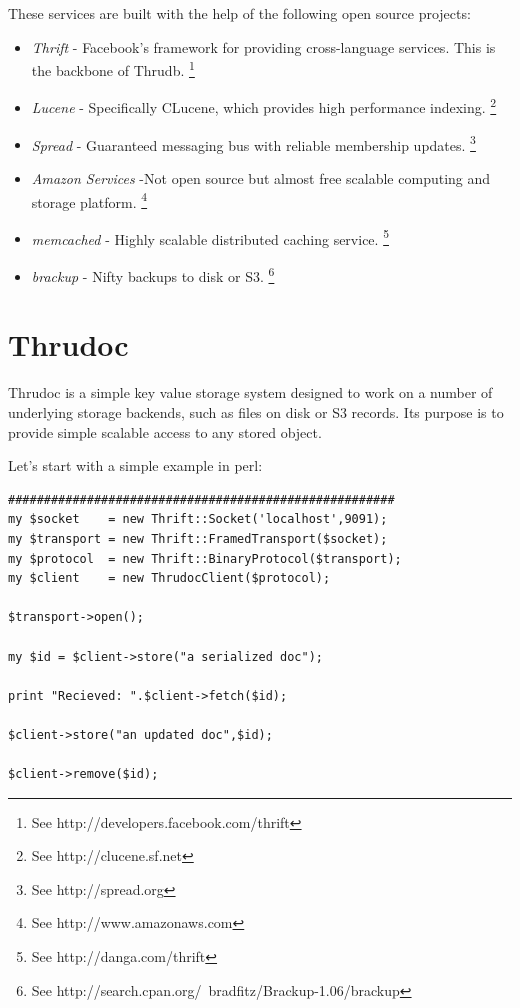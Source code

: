 \documentclass[nocopyrightspace,blockstyle]{sigplanconf}
\begin{document}
These services are built with the help of the following open source projects:
\begin{itemize}
\item\textit{Thrift}    - Facebook's framework for providing cross-language services.  This is the backbone of Thrudb. \footnote{See http://developers.facebook.com/thrift}

\item\textit{Lucene}    - Specifically CLucene, which provides high performance indexing. \footnote{See http://clucene.sf.net}

\item\textit{Spread}    - Guaranteed messaging bus with reliable membership updates. \footnote{See http://spread.org}

\item\textit{Amazon Services} -Not open source but almost free scalable computing and storage platform. \footnote{See http://www.amazonaws.com}

\item\textit{memcached} - Highly scalable distributed caching service. \footnote{See http://danga.com/thrift}

\item\textit{brackup}   - Nifty backups to disk or S3. \footnote{See http://search.cpan.org/~bradfitz/Brackup-1.06/brackup}
\end{itemize}

\section{Thrudoc}

Thrudoc is a simple key value storage system designed to work on a number of underlying storage backends, such as files on disk or S3 records.
Its purpose is to provide simple scalable access to any stored object.

Let's start with a simple example in perl: 

\begin{verbatim}
######################################################
my $socket    = new Thrift::Socket('localhost',9091);
my $transport = new Thrift::FramedTransport($socket);
my $protocol  = new Thrift::BinaryProtocol($transport);
my $client    = new ThrudocClient($protocol);

$transport->open();

my $id = $client->store("a serialized doc");
  
print "Recieved: ".$client->fetch($id);

$client->store("an updated doc",$id);

$client->remove($id);

\end{verbatim}
  
\end{document}
